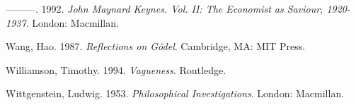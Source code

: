 \documentclass[noflushend]{philosophersimprint}
\newlength{\cslhangindent}
\newenvironment{CSLReferences}[3] %
 {%
  \setlength{\parindent}{0pt}
  \ifodd #1 \everypar{\setlength{\hangindent}{\cslhangindent}}\ignorespaces\fi
  \ifnum #2 > 0
  \setlength{\parskip}{#2\baselineskip}
  \fi
 }%
 {}
\begin{document}
\begin{CSLReferences}{1}{0}
\leavevmode{}%
---------. 1992. \emph{John Maynard Keynes. Vol. II: The Economist as
Saviour, 1920-1937}. London: Macmillan.

\leavevmode{}%
Wang, Hao. 1987. \emph{Reflections on Gôdel}. Cambridge, MA: MIT Press.

\leavevmode{}%
Williamson, Timothy. 1994. \emph{{Vagueness}}. Routledge.

\leavevmode{}%
Wittgenstein, Ludwig. 1953. \emph{Philosophical Investigations}. London:
Macmillan.

\end{CSLReferences}


\end{document}
